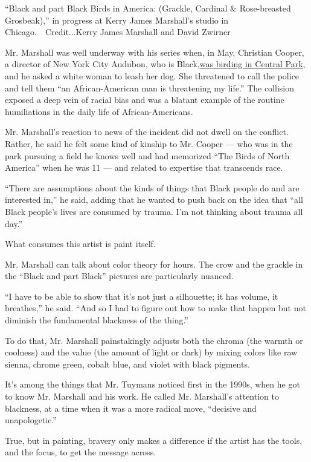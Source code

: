 ``Black and part Black Birds in America: (Grackle, Cardinal \&
Rose-breasted Grosbeak),'' in progress at Kerry James Marshall's studio
in Chicago.~~Credit...Kerry James Marshall and David Zwirner

Mr. Marshall was well underway with his series when, in May, Christian
Cooper, a director of New York City Audubon, who is
Black,\href{https://www.nytimes3xbfgragh.onion/2020/06/14/nyregion/central-park-amy-cooper-christian-racism.html}{was
birding in Central Park}, and he asked a white woman to leash her dog.
She threatened to call the police and tell them ``an African-American
man is threatening my life.'' The collision exposed a deep vein of
racial bias and was a blatant example of the routine humiliations in the
daily life of African-Americans.

Mr. Marshall's reaction to news of the incident did not dwell on the
conflict. Rather, he said he felt some kind of kinship to Mr. Cooper ---
who was in the park pursuing a field he knows well and had memorized
``The Birds of North America'' when he was 11 --- and related to
expertise that transcends race.

``There are assumptions about the kinds of things that Black people do
and are interested in,'' he said, adding that he wanted to push back on
the idea that ``all Black people's lives are consumed by trauma. I'm not
thinking about trauma all day.''

What consumes this artist is paint itself.

Mr. Marshall can talk about color theory for hours. The crow and the
grackle in the ``Black and part Black'' pictures are particularly
nuanced.

``I have to be able to show that it's not just a silhouette; it has
volume, it breathes,'' he said. ``And so I had to figure out how to make
that happen but not diminish the fundamental blackness of the thing.''

To do that, Mr. Marshall painstakingly adjusts both the chroma (the
warmth or coolness) and the value (the amount of light or dark) by
mixing colors like raw sienna, chrome green, cobalt blue, and violet
with black pigments.

It's among the things that Mr. Tuymans noticed first in the 1990s, when
he got to know Mr. Marshall and his work. He called Mr. Marshall's
attention to blackness, at a time when it was a more radical move,
``decisive and unapologetic.''

True, but in painting, bravery only makes a difference if the artist has
the tools, and the focus, to get the message across.

